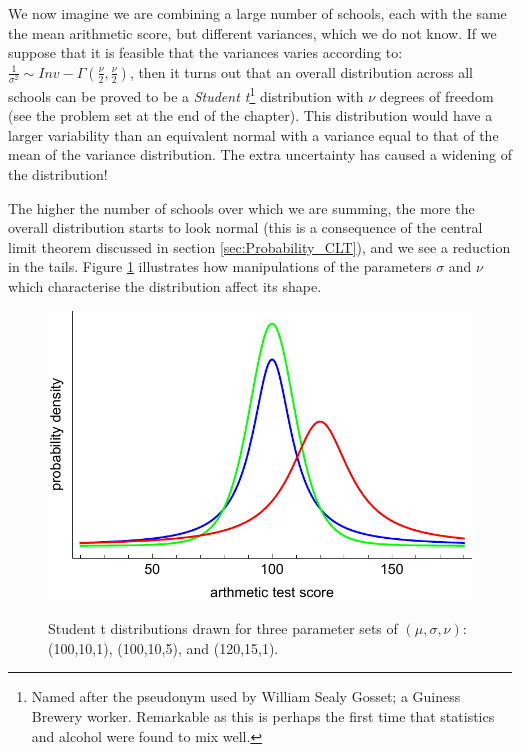 \documentclass[11pt,fullpage]{book}
\begin{document}
We now imagine we are combining a large number of schools, each with the same the mean arithmetic score, but different variances, which we do not know. If we suppose that it is feasible that the variances varies according to: $\frac{1}{\sigma^2}\sim Inv-\Gamma(\frac{\nu}{2},\frac{\nu}{2})$, then it turns out that an overall distribution across all schools can be proved to be a \textit{Student t}\footnote{Named after the pseudonym used by William Sealy Gosset; a Guiness Brewery worker. Remarkable as this is perhaps the first time that statistics and alcohol were found to mix well.} distribution with $\nu$ degrees of freedom (see the problem set at the end of the chapter). This distribution would have a larger variability than an equivalent normal with a variance equal to that of the mean of the variance distribution. The extra uncertainty has caused a widening of the distribution!

The higher the number of schools over which we are summing, the more the overall distribution starts to look normal (this is a consequence of the central limit theorem discussed in section \ref{sec:Probability_CLT}), and we see a reduction in the tails. Figure \ref{fig:Distributions_tArithmeticExposition} illustrates how manipulations of the parameters $\sigma$ and $\nu$ which characterise the distribution affect its shape.

\begin{figure}
\centering
\scalebox{0.5} 
{\includegraphics{Distributions_tArithmeticExposition.pdf}}
\caption{Student t distributions drawn for three parameter sets of $(\mu,\sigma,\nu)$: (100,10,1), (100,10,5), and (120,15,1).}\label{fig:Distributions_tArithmeticExposition}
\end{figure}
\end{document}
